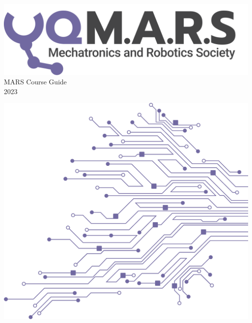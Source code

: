 \documentclass[a4paper,12pt]{report}
\begin{document}
\begin{titlepage}
    \begin{center}
        \vspace*{15mm}
        \includegraphics[width=0.7\paperwidth]{../Assets/Logo (Dark).png} \\
        \vspace{1cm}
        \Huge MARS Course Guide \\
        \huge \textcolor{turbo_purple}{2023}
    \end{center}
    \vfill
    \includegraphics[height=0.5\paperheight, right]{../Assets/Pattern - PCB (Solid).png}
    \vspace*{10mm}
\end{titlepage}
\restoregeometry
\newpage
\tableofcontents


    













\end{document}
